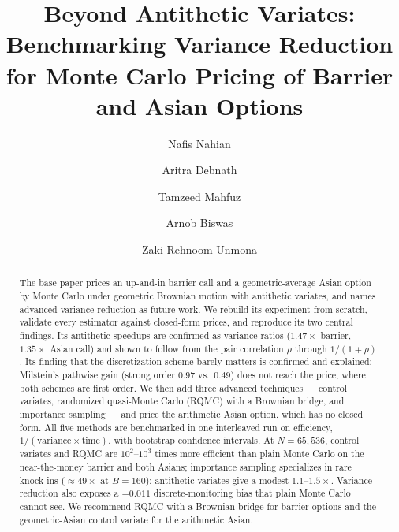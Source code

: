 \documentclass[sigconf]{acmart}
\begin{document}
\title{Beyond Antithetic Variates: Benchmarking Variance Reduction for Monte
Carlo Pricing of Barrier and Asian Options}

\newcommand{\groupnumber}{07}
\newcommand{\coursesection}{A}

\author{Nafis Nahian}

\author{Aritra Debnath}

\author{Tamzeed Mahfuz}

\author{Arnob Biswas}

\author{Zaki Rehnoom Unmona}

\renewcommand{\shortauthors}{Nahian, Debnath, Mahfuz, Biswas, and Zaki}

\begin{abstract}
The base paper prices an up-and-in barrier call and a geometric-average Asian
option by Monte Carlo under geometric Brownian motion with antithetic
variates, and names advanced variance reduction as future work. We rebuild
its experiment from scratch, validate every estimator against closed-form
prices, and reproduce its two central findings. Its antithetic speedups are
confirmed as variance ratios ($1.47\times$ barrier, $1.35\times$ Asian call)
and shown to follow from the pair correlation $\rho$ through $1/(1+\rho)$. Its
finding that the discretization scheme barely matters is confirmed and
explained: Milstein's pathwise gain (strong order $0.97$ vs.\ $0.49$) does not
reach the price, where both schemes are first order. We then add three
advanced techniques --- control variates, randomized quasi-Monte Carlo (RQMC)
with a Brownian bridge, and importance sampling --- and price the arithmetic
Asian option, which has no closed form. All five methods are benchmarked in
one interleaved run on efficiency, $1/(\text{variance}\times\text{time})$,
with bootstrap confidence intervals. At $N=65{,}536$, control variates and
RQMC are $10^2$--$10^3$ times more efficient than plain Monte Carlo on the
near-the-money barrier and both Asians; importance sampling specializes in
rare knock-ins ($\approx 49\times$ at $B=160$); antithetic variates give a
modest $1.1$--$1.5\times$. Variance reduction also exposes a $-0.011$
discrete-monitoring bias that plain Monte Carlo cannot see. We recommend RQMC
with a Brownian bridge for barrier options and the geometric-Asian control
variate for the arithmetic Asian.
\end{abstract}
\end{document}
